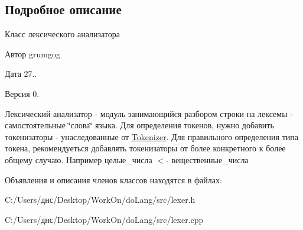 \subsection{Подробное описание}
Класс лексического анализатора 

\begin{DoxyAuthor}{Автор}
grumgog 
\end{DoxyAuthor}
\begin{DoxyDate}{Дата}
27.. 
\end{DoxyDate}
\begin{DoxyVersion}{Версия}
0.
\end{DoxyVersion}
Лексический анализатор -\/ модуль занимающийся разбором строки на лексемы -\/ самостоятельные \char`\"{}слова\char`\"{} языка. Для определения токенов, нужно добавить токенизаторы -\/ унаследованные от \hyperlink{classlex_1_1_tokenizer}{Tokenizer}. Для правильного определения типа токена, рекомендуеться добавлять токенизаторы от более конкретного к более общему случаю. Например целые\+\_\+числа $<$-\/ вещественные\+\_\+числа 

Объявления и описания членов классов находятся в файлах\+:\begin{DoxyCompactItemize}
\item 
C\+:/\+Users/днс/\+Desktop/\+Work\+On/do\+Lang/src/lexer.\+h\item 
C\+:/\+Users/днс/\+Desktop/\+Work\+On/do\+Lang/src/lexer.\+cpp\end{DoxyCompactItemize}
